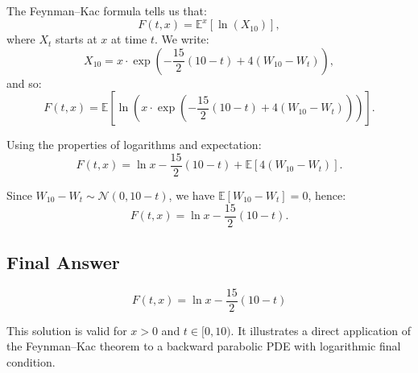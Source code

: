 The Feynman–Kac formula tells us that:
\[
F(t,x) = \mathbb{E}^x\left[ \ln(X_{10}) \right],
\]
where \( X_t \) starts at \( x \) at time \( t \). We write:
\[
X_{10} = x \cdot \exp\left(-\frac{15}{2}(10 - t) + 4(W_{10} - W_t)\right),
\]
and so:
\[
F(t,x) = \mathbb{E}\left[ \ln \left( x \cdot \exp\left( -\frac{15}{2}(10 - t) + 4(W_{10} - W_t) \right) \right) \right].
\]

Using the properties of logarithms and expectation:
\[
F(t,x) = \ln x - \frac{15}{2}(10 - t) + \mathbb{E}[4(W_{10} - W_t)].
\]

Since \( W_{10} - W_t \sim \mathcal{N}(0, 10 - t) \), we have \( \mathbb{E}[W_{10} - W_t] = 0 \), hence:
\[
F(t,x) = \ln x - \frac{15}{2}(10 - t).
\]

\subsection*{Final Answer}

\[
\boxed{F(t,x) = \ln x - \frac{15}{2}(10 - t)}
\]

This solution is valid for \( x > 0 \) and \( t \in [0,10) \). It illustrates a direct application of the Feynman–Kac theorem to a backward parabolic PDE with logarithmic final condition.